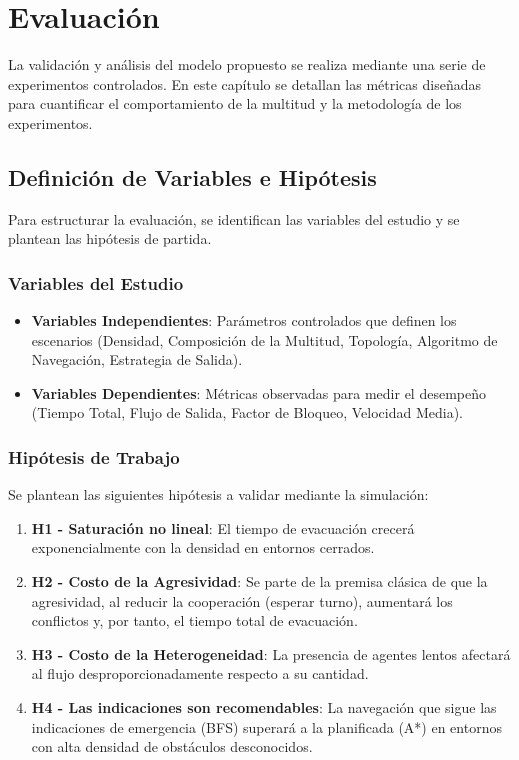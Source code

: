 \documentclass[11pt,spanish,listoffigures,listoftables]{tfgetsinf}
\begin{document}
\chapter{Evaluación}

La validación y análisis del modelo propuesto se realiza mediante una serie de experimentos controlados. En este capítulo se detallan las métricas diseñadas para cuantificar el comportamiento de la multitud y la metodología de los experimentos.

\section{Definición de Variables e Hipótesis}

Para estructurar la evaluación, se identifican las variables del estudio y se plantean las hipótesis de partida.

\subsection{Variables del Estudio}
\begin{itemize}
    \item \textbf{Variables Independientes}: Parámetros controlados que definen los escenarios (Densidad, Composición de la Multitud, Topología, Algoritmo de Navegación, Estrategia de Salida).
    
    \item \textbf{Variables Dependientes}: Métricas observadas para medir el desempeño (Tiempo Total, Flujo de Salida, Factor de Bloqueo, Velocidad Media).
\end{itemize}

\subsection{Hipótesis de Trabajo}
Se plantean las siguientes hipótesis a validar mediante la simulación:
\begin{enumerate}
    \item \textbf{H1 - Saturación no lineal}: El tiempo de evacuación crecerá exponencialmente con la densidad en entornos cerrados.
    \item \textbf{H2 - Costo de la Agresividad}: Se parte de la premisa clásica de que la agresividad, al reducir la cooperación (esperar turno), aumentará los conflictos y, por tanto, el tiempo total de evacuación.
    \item \textbf{H3 - Costo de la Heterogeneidad}: La presencia de agentes lentos afectará al flujo desproporcionadamente respecto a su cantidad.
    \item \textbf{H4 - Las indicaciones son recomendables}: La navegación que sigue las indicaciones de emergencia (BFS) superará a la planificada (A*) en entornos con alta densidad de obstáculos desconocidos.
\end{enumerate}
\end{document}
